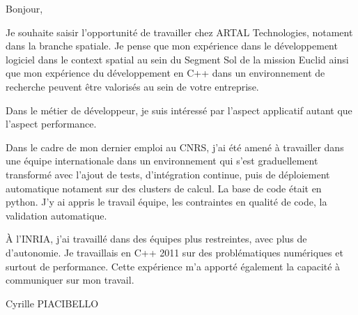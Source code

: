 \documentclass{article}
\begin{document}
Bonjour,

Je souhaite saisir l'opportunité de travailler chez ARTAL
Technologies, notament dans la branche spatiale. Je pense que mon
expérience dans le développement logiciel dans le context spatial au
sein du Segment Sol de la mission Euclid ainsi que mon expérience du
développement en C++ dans un environnement de recherche peuvent être
valorisés au sein de votre entreprise.

Dans le métier de développeur, je suis intéressé par l'aspect
applicatif autant que l'aspect performance. 

Dans le cadre de mon dernier emploi au CNRS, j'ai été amené à
travailler dans une équipe internationale dans un environnement qui
s'est graduellement transformé avec l'ajout de tests, d'intégration
continue, puis de déploiement automatique notament sur des clusters de
calcul. La base de code était en python. J'y ai appris le travail
équipe, les contraintes en qualité de code, la validation
automatique.

À l'INRIA, j'ai travaillé dans des équipes plus restreintes, avec plus
de d'autonomie. Je travaillais en C++ 2011 sur des problématiques
numériques et surtout de performance. Cette expérience m'a apporté
également la capacité à communiquer sur mon travail.

\bigskip %



\vspace{50pt} %

Cyrille PIACIBELLO
\end{document}
